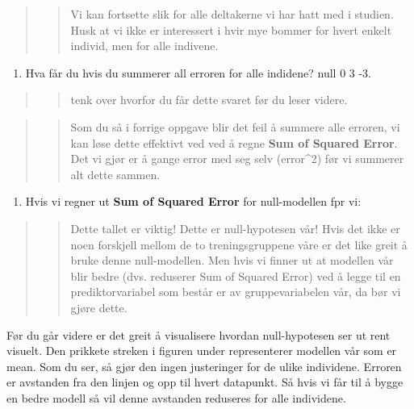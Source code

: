 \documentclass[
]{book}
\providecommand{\tightlist}{%
  \setlength{\itemsep}{0pt}\setlength{\parskip}{0pt}}
\begin{document}
\begin{quote}
\begin{quote}
Vi kan fortsette slik for alle deltakerne vi har hatt med i studien. Husk at vi ikke er interessert i hvir mye bommer for hvert enkelt individ, men for alle indivene.
\end{quote}
\end{quote}

\begin{enumerate}
\def\labelenumi{\alph{enumi}.}
\setcounter{enumi}{1}
\tightlist
\item
  Hva får du hvis du summerer all erroren for alle indidene? null 0 3 -3.
\end{enumerate}

\begin{quote}
\begin{quote}
tenk over hvorfor du får dette svaret før du leser videre.
\end{quote}
\end{quote}

\begin{quote}
\begin{quote}
Som du så i forrige oppgave blir det feil å summere alle erroren, vi kan løse dette effektivt ved ved å regne \textbf{Sum of Squared Error}. Det vi gjør er å gange error med seg selv (error\^{}2) før vi summerer alt dette sammen.
\end{quote}
\end{quote}

\begin{enumerate}
\def\labelenumi{\alph{enumi}.}
\setcounter{enumi}{2}
\tightlist
\item
  Hvis vi regner ut \textbf{Sum of Squared Error} for null-modellen fpr vi:
\end{enumerate}

\begin{quote}
\begin{quote}
Dette tallet er viktig! Dette er null-hypotesen vår! Hvis det ikke er noen forskjell mellom de to treningsgruppene våre er det like greit å bruke denne null-modellen. Men hvis vi finner ut at modellen vår blir bedre (dvs. reduserer Sum of Squared Error) ved å legge til en prediktorvariabel som består er av gruppevariabelen vår, da bør vi gjøre dette.
\end{quote}
\end{quote}

Før du går videre er det greit å visualisere hvordan null-hypotesen ser ut rent visuelt. Den prikkete streken i figuren under representerer modellen vår som er mean. Som du ser, så gjør den ingen justeringer for de ulike individene. Erroren er avstanden fra den linjen og opp til hvert datapunkt. Så hvis vi får til å bygge en bedre modell så vil denne avstanden reduseres for alle individene.
\end{document}
